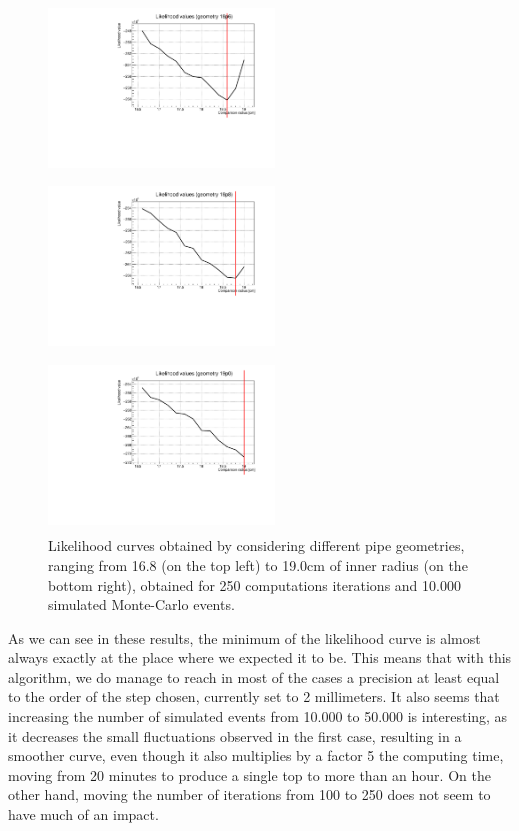 \documentclass[a4paper, 11pt]{report}
\begin{document}
\begin{figure}[htbp]
\begin{minipage}[b]{.32\textwidth}
\includegraphics[width=6cm, height=4.6cm]{figs/likelihood250LowStat/likelihood18p6.pdf}
\end{minipage}\hfill
\begin{minipage}[b]{.32\textwidth}
\includegraphics[width=6cm, height=4.6cm]{figs/likelihood250LowStat/likelihood18p8.pdf}
\end{minipage} \hfill
\begin{minipage}[b]{.32\textwidth}
\includegraphics[width=6cm, height=4.6cm]{figs/likelihood250LowStat/likelihood19p0.pdf}
\end{minipage} \hfill
\caption{Likelihood curves obtained by considering different pipe geometries, ranging from 16.8 (on the top left) to 19.0cm of inner radius (on the bottom right), obtained for 250 computations iterations and 10.000 simulated Monte-Carlo events.}
\label{fig:likelihoods3}
\end{figure}

As we can see in these results, the minimum of the likelihood curve is almost always exactly at the place where we expected it to be. This means that with this algorithm, we do manage to reach in most of the cases a precision at least equal to the order of the step chosen, currently set to 2 millimeters. It also seems that increasing the number of simulated events from 10.000 to 50.000 is interesting, as it decreases the small fluctuations observed in the first case, resulting in a smoother curve, even though it also multiplies by a factor 5 the computing time, moving from 20 minutes to produce a single top to more than an hour. On the other hand, moving the number of iterations from 100 to 250 does not seem to have much of an impact.
\end{document}
